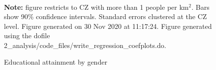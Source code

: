 \begin{figure}[!h]
\centering
\caption{Educational attainment by gender}
\label{figure:education_shares}
  \\ 
\par \begin{minipage}[h]{\textwidth}{\tiny\textbf{Note:} figure restricts to CZ with more than 1 people per km$^2$. Bars show 90\% confidence intervals. Standard errors clustered at the CZ level. Figure generated on 30 Nov 2020 at 11:17:24. Figure generated using the dofile 2\_analysis/code\_files/write\_regression\_coefplots.do.}\end{minipage}
\end{figure}
